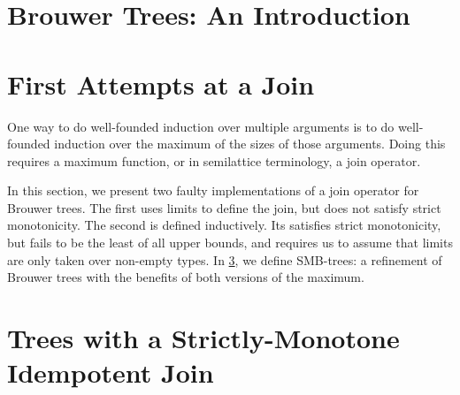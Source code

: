 



\section{Brouwer Trees: An Introduction}




\section{First Attempts at a Join}
\label{sec:join}
One way to do well-founded induction over multiple arguments is to do well-founded
induction over the maximum of the sizes of those arguments. Doing this requires
a maximum function, or in semilattice terminology, a join operator.

In this section, we present two faulty implementations of a join operator
for Brouwer trees. The first uses limits to define the join, but does not satisfy
strict monotonicity. The second is defined inductively. Its satisfies
strict monotonicity, but fails to be the least of all upper bounds,
and requires us to assume that limits are only taken over non-empty types.
In \cref{sec:strict}, we define SMB-trees: a refinement of Brouwer trees with
the benefits of both versions of the maximum.
  
  

  \section{Trees with a Strictly-Monotone Idempotent Join}
  \label{sec:strict}










